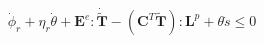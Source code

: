 \documentclass[preview]{standalone}
\begin{document}
\begin{align*}
\dot{\phi}_r + \eta_r \dot{\theta} + \mathbf{E}^e : \dot{\tilde{\mathbf{T}}} - (\mathbf{C}^T \tilde{\mathbf{T}}) : \mathbf{L}^p + \theta \dot{s} \leq 0
\end{align*}
\end{document}
